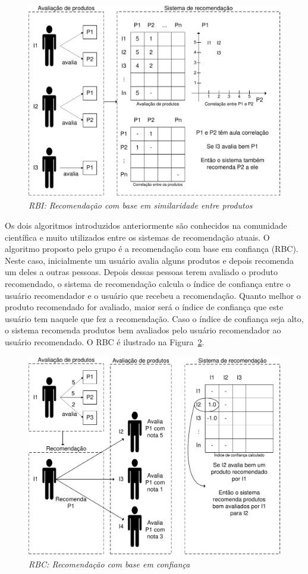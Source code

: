\begin{figure}
  \centering
  \includegraphics[width=\textwidth]{imagens/RBI}
  \caption{\it RBI: Recomendação com base em similaridade entre produtos}
  \label{fig:RBI}
\end{figure}

 Os dois algoritmos introduzidos anteriormente são conhecidos na comunidade científica e muito utilizados entre os sistemas de recomendação atuais. O algoritmo proposto pelo grupo é a recomendação com base em confiança (RBC). Neste caso, inicialmente um usuário avalia alguns produtos e depois recomenda um deles a outras pessoas. Depois dessas pessoas terem avaliado o produto recomendado, o sistema de recomendação calcula o índice de confiança entre o usuário recomendador e o usuário que recebeu a recomendação. Quanto melhor o produto recomendado for avaliado, maior será o índice de confiança que este usuário tem naquele que fez a recomendação. Caso o índice de confiança seja alto, o sistema recomenda produtos bem avaliados pelo usuário recomendador ao usuário recomendado. O RBC é ilustrado na Figura~\ref{fig:RBC}.

\begin{figure}
  \centering
  \includegraphics[width=\textwidth]{imagens/RBC}
  \caption{\it RBC: Recomendação com base em confiança}
  \label{fig:RBC}
\end{figure}

